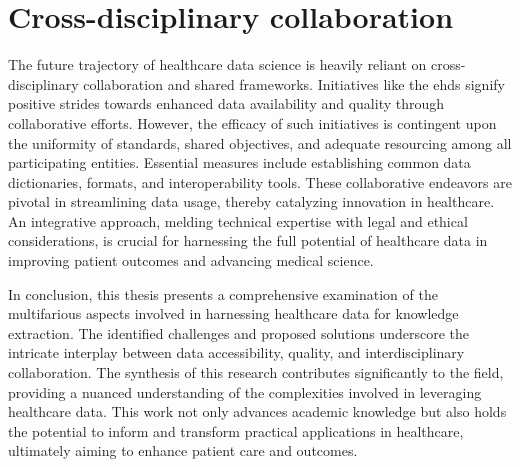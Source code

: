 \section{Cross-disciplinary collaboration}
The future trajectory of healthcare data science is heavily reliant on cross-disciplinary collaboration and shared frameworks. Initiatives like the \ac{ehds} signify positive strides towards enhanced data availability and quality through collaborative efforts. However, the efficacy of such initiatives is contingent upon the uniformity of standards, shared objectives, and adequate resourcing among all participating entities. Essential measures include establishing common data dictionaries, formats, and interoperability tools. These collaborative endeavors are pivotal in streamlining data usage, thereby catalyzing innovation in healthcare. An integrative approach, melding technical expertise with legal and ethical considerations, is crucial for harnessing the full potential of healthcare data in improving patient outcomes and advancing medical science.


In conclusion, this thesis presents a comprehensive examination of the multifarious aspects involved in harnessing healthcare data for knowledge extraction. The identified challenges and proposed solutions underscore the intricate interplay between data accessibility, quality, and interdisciplinary collaboration. The synthesis of this research contributes significantly to the field, providing a nuanced understanding of the complexities involved in leveraging healthcare data. This work not only advances academic knowledge but also holds the potential to inform and transform practical applications in healthcare, ultimately aiming to enhance patient care and outcomes.


